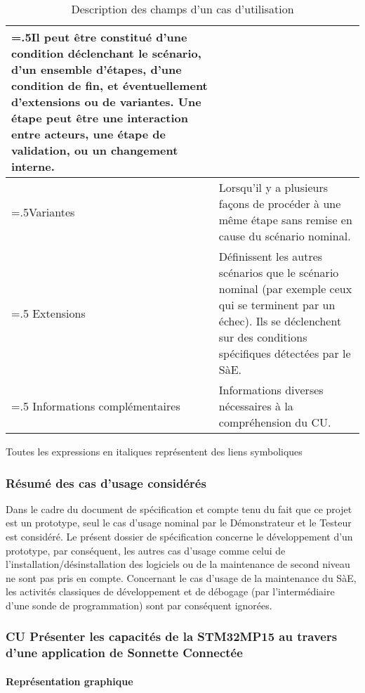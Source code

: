 \begin{table}[H]
\begin{tabularx}{\textwidth}{|>{\hsize=.5\hsize}X|>{\hsize=1.5\hsize}X|}
    Il peut être constitué d’une condition déclenchant le scénario, d’un ensemble d’étapes, d’une condition de fin, et éventuellement d’extensions ou de variantes.
    Une étape peut être une interaction entre acteurs, une étape de validation, ou un changement interne.\\
    \hline
    Variantes &
    Lorsqu’il y a plusieurs façons de procéder à une même étape sans remise en cause du scénario nominal.\\
    \hline
    Extensions &
    Définissent les autres scénarios que le scénario nominal (par exemple ceux qui se terminent par un échec).
    Ils se déclenchent sur des conditions spécifiques détectées par le SàE.\\
    \hline
    Informations complémentaires &
    Informations diverses nécessaires à la compréhension du CU.\\
    \hline
  \end{tabularx}
  \caption{Description des champs d'un cas d'utilisation}
  \label{tableau-exemple-cu}
\end{table}

Toutes les expressions en italiques représentent des liens symboliques \\

\subsubsection{Résumé des cas d'usage considérés}

Dans le cadre du document de spécification et compte tenu du fait que ce projet est un prototype, seul le cas d'usage nominal par le Démonstrateur et le Testeur est considéré.
Le présent dossier de spécification concerne le développement d'un prototype, par conséquent, les autres cas d'usage comme celui de l'installation/désinstallation des logiciels ou de la maintenance de second niveau ne sont pas pris en compte. 
Concernant le cas d'usage de la maintenance du SàE, les activités classiques de développement et de débogage (par l'intermédiaire d'une sonde de programmation) sont par conséquent ignorées. \\

\subsubsection{CU Présenter les capacités de la STM32MP15 au travers d'une application de Sonnette Connectée}

\paragraph{Représentation graphique}

